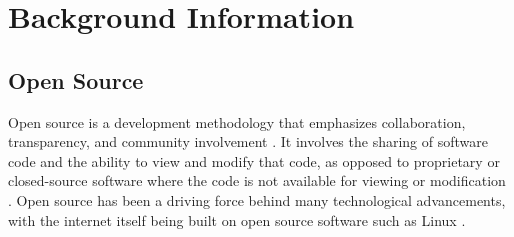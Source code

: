 \documentclass{IEEEtran}
\begin{document}










\section{Background Information}


\subsection{Open Source}
Open source is a development methodology that emphasizes collaboration, transparency, and community involvement \cite{dibona1999opensource}. It involves the sharing of software code and the ability to view and modify that code, as opposed to proprietary or closed-source software where the code is not available for viewing or modification \cite{dibona1999opensource}. Open source has been a driving force behind many technological advancements, with the internet itself being built on open source software such as Linux \cite{dibona1999opensource}.
\end{document}
